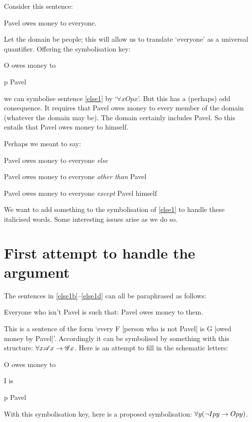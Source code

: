 Consider this sentence:
\begin{earg}
\item[\ex{else1}] Pavel owes money to everyone.
\end{earg}
Let the domain be people; this will allow us to translate `everyone' as a universal quantifier. Offering the symbolisation key:
	\begin{ekey}
		\item[O]  owes money to 
		\item[p] Pavel
	\end{ekey}
we can symbolise sentence \ref{else1} by `$\forall x Opx$'. But this has a (perhaps) odd consequence. It requires that Pavel owes money to every member of the domain (whatever the domain may be). The domain certainly includes Pavel. So this entails that Pavel owes money to himself. 

Perhaps we meant to say:
	\begin{earg}
		\item[\ex{else1b}] Pavel owes money to everyone \emph{else}
		\item[\ex{else1c}] Pavel owes money to everyone \emph{other than} Pavel
		\item[\ex{else1d}] Pavel owes money to everyone \emph{except} Pavel himself
	\end{earg}
We want to add something to the symbolisation of \ref{else1} to handle these italicised words. Some interesting issues arise as we do so.


\section{First attempt to handle the argument}

The sentences in \ref{else1b}–\ref{else1d} can all be paraphrased as follows:
\begin{earg}
	\item[\ex{else1e}] Everyone who isn't Pavel is such that: Pavel owes money to them.
\end{earg} This is a sentence of the form `every F [person who is not Pavel] is G [owed money by Pavel]'. Accordingly it can be symbolised by something with this structure: $\forall x \mathscr{A}x \rightarrow \mathscr{G}x$. Here is an attempt to fill in the schematic letters:
	\begin{ekey}
		\item[O]  owes money to \gap{2}
		\item[I]  is \gap{2}
		\item[p] Pavel
	\end{ekey}
With this symbolisation  key, here is a proposed symbolisation: $\forall y (\neg Ipy \rightarrow Opy)$. 

